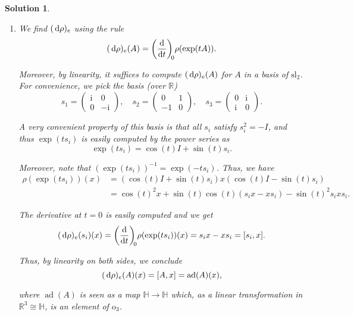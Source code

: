 \documentclass{article}
\theoremstyle{nonumberplain}
\newtheorem{sol}{Solution}
\newcommand{\R}{\mathbb{R}}
\newcommand{\I}{\mathrm{i}}
\DeclareMathOperator{\ad}{ad}
\newcommand{\la}[1]{\mathrm{#1}}
\newcommand{\bbH}{\mathbb{H}}
\begin{document}
\begin{sol}
\begin{enumerate}
\item We find $(\dl \rho)_e$ using the rule
\begin{equation}
(\dl \rho)_e(A) = \diff{}t[0] \rho(\exp(t A)).
\end{equation}

Moreover, by linearity, it suffices to compute $(\dl \rho)_e(A)$ for $A$ in a basis of $\la{sl}_2$. For convenience, we pick the basis (over $\R$)
\begin{equation}
s_1 = \begin{pmatrix} \I & 0 \\ 0 & -\I \end{pmatrix},
\quad
s_2 = \begin{pmatrix} 0 & 1 \\ -1 & 0 \end{pmatrix},
\quad
s_3 = \begin{pmatrix} 0 & \I \\ \I & 0 \end{pmatrix}.
\end{equation}

A very convenient property of this basis is that all $s_i$ satisfy $s_i^2 = -I$, and thus $\exp(t s_i)$ is easily computed by the power series as
\begin{equation}
\exp(t s_i) = \cos(t) I + \sin(t) s_i.
\end{equation}

Moreover, note that $(\exp(t s_i))^{-1} = \exp(-t s_i)$. Thus, we have
\begin{equation}
\begin{aligned}
\rho(\exp(t s_i))(x) &= (\cos(t) I + \sin(t) s_i) x (\cos(t) I - \sin(t) s_i)\\
&=\cos(t)^2 x + \sin(t) \cos(t) (s_i x - x s_i) - \sin(t)^2 s_i x s_i.
\end{aligned}
\end{equation}

The derivative at $t = 0$ is easily computed and we get
\begin{equation}
(\dl \rho)_e(s_i)(x) = \diff{}t[0] \rho(\exp(t s_i))(x) = s_i x - x s_i = [s_i, x].
\end{equation}

Thus, by linearity on both sides, we conclude
\begin{equation}
(\dl \rho)_e(A)(x) = [A, x] = \ad(A)(x),
\end{equation}

where $\ad(A)$ is seen as a map $\bbH \to \bbH$ which, as a linear transformation in $\R^3 \cong \bbH$, is an element of $\la{o}_3$.


\end{enumerate}
\end{sol}
\end{document}
